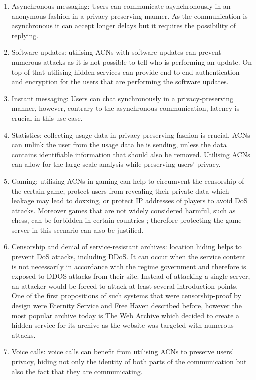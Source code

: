\begin{enumerate}
    \item Asynchronous messaging: Users can communicate asynchronously in an anonymous fashion in a privacy-preserving manner. As the communication is asynchronous it can accept longer delays but it requires the possibility of replying.
    \item Software updates: utilising ACNs with software updates can prevent numerous attacks as it is not possible to tell who is performing an update. On top of that utilising hidden services can provide end-to-end authentication and encryption for the users that are performing the software updates.
    \item Instant messaging: Users can chat synchronously in a privacy-preserving manner, however, contrary to the asynchronous communication, latency is crucial in this use case.
    \item Statistics: collecting usage data in privacy-preserving fashion is crucial. ACNs can unlink the user from the usage data he is sending, unless the data contains identifiable information that should also be removed. Utilising ACNs can allow for the large-scale analysis while preserving users' privacy.
    \item Gaming: utilising ACNs in gaming can help to circumvent the censorship of the certain game, protect users from revealing their private data which leakage may lead to doxxing, or protect IP addresses of players to avoid DoS attacks. Moreover games that are not widely considered harmful, such as chess, can be forbidden in certain countries \cite{afghanistan-chess}; therefore protecting the game server in this scenario can also be justified.
    \item Censorship and denial of service-resistant archives: location hiding helps to prevent DoS attacks, including DDoS. It can occur when the service content is not necessarily in accordance with the regime government and therefore is exposed to DDOS attacks from their site. Instead of attacking a single server, an attacker would be forced to attack at least several introduction points. One of the first propositions of such systems that were censorship-proof by design were Eternity Service and Free Haven described before, however the most popular archive today is The Web Archive which decided to create a hidden service for its archive as the website was targeted with numerous attacks.
    \item Voice calls: voice calls can benefit from utilising ACNs to preserve users’ privacy, hiding not only the identity of both parts of the communication but also the fact that they are communicating.

\end{enumerate}
